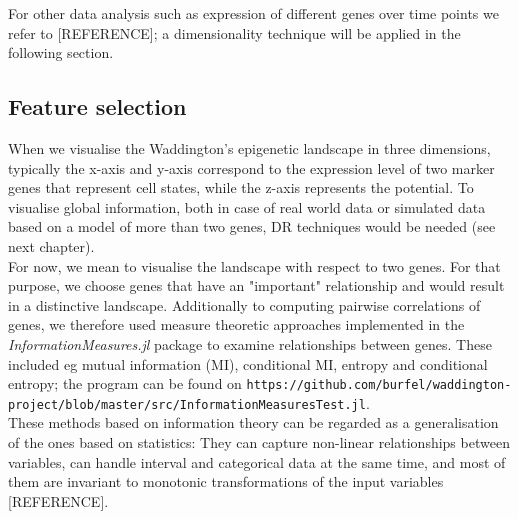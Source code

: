 \documentclass[journal, a4paper]{IEEEtran}
\begin{document}


For other data analysis such as  expression of different genes over time points we refer to [REFERENCE]; a dimensionality technique will be applied in the following section. 



\subsection{Feature selection}

When we visualise the Waddington's epigenetic landscape in three dimensions, typically the x-axis and y-axis correspond to the expression level of two marker genes that represent cell states, while the z-axis represents the potential. To visualise global information, both in case of real world data or simulated data based on a model of more than two genes, DR techniques would be needed (see next chapter).\\

For now, we mean to visualise the landscape with respect to two genes. For that purpose, we choose genes that have an "important" relationship and would result in a distinctive landscape. 
Additionally to computing pairwise correlations of genes, we therefore used measure theoretic approaches implemented in the \textit{InformationMeasures.jl} package to examine relationships between genes. These included eg mutual information (MI), conditional MI,  entropy and conditional entropy; %
the program can be found on \texttt{https://github.com/burfel/waddington-project/blob/master/src/InformationMeasuresTest.jl}.\\

These methods based on information theory can be regarded as a generalisation of the ones based on statistics: They can capture non-linear relationships between variables, can handle interval and categorical data at the same time, and most of them are invariant to monotonic transformations of the input variables [REFERENCE].
\end{document}

